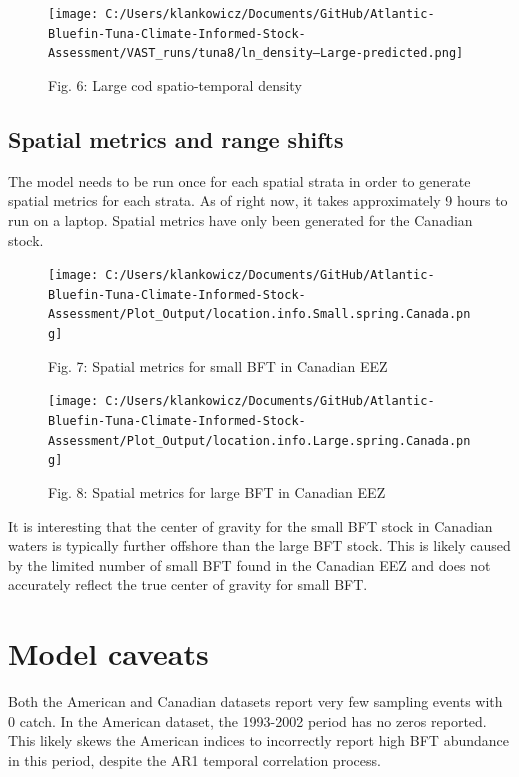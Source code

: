 \documentclass[
]{article}
\begin{document}
\begin{figure}
\centering
\texttt{[image: C:/Users/klankowicz/Documents/GitHub/Atlantic-Bluefin-Tuna-Climate-Informed-Stock-Assessment/VAST\_runs/tuna8/ln\_density--Large-predicted.png]}
\caption{Fig. 6: Large cod spatio-temporal density}
\end{figure}

\hypertarget{spatial-metrics-and-range-shifts}{%
\subsection{Spatial metrics and range shifts}\label{spatial-metrics-and-range-shifts}}

The model needs to be run once for each spatial strata in order to generate spatial metrics for each strata. As of right now, it takes approximately 9 hours to run on a laptop. Spatial metrics have only been generated for the Canadian stock.

\begin{figure}
\centering
\texttt{[image: C:/Users/klankowicz/Documents/GitHub/Atlantic-Bluefin-Tuna-Climate-Informed-Stock-Assessment/Plot\_Output/location.info.Small.spring.Canada.png]}
\caption{Fig. 7: Spatial metrics for small BFT in Canadian EEZ}
\end{figure}

\begin{figure}
\centering
\texttt{[image: C:/Users/klankowicz/Documents/GitHub/Atlantic-Bluefin-Tuna-Climate-Informed-Stock-Assessment/Plot\_Output/location.info.Large.spring.Canada.png]}
\caption{Fig. 8: Spatial metrics for large BFT in Canadian EEZ}
\end{figure}

It is interesting that the center of gravity for the small BFT stock in Canadian waters is typically further offshore than the large BFT stock. This is likely caused by the limited number of small BFT found in the Canadian EEZ and does not accurately reflect the true center of gravity for small BFT.

\hypertarget{model-caveats}{%
\section{Model caveats}\label{model-caveats}}

Both the American and Canadian datasets report very few sampling events with 0 catch. In the American dataset, the 1993-2002 period has no zeros reported. This likely skews the American indices to incorrectly report high BFT abundance in this period, despite the AR1 temporal correlation process.
\end{document}

